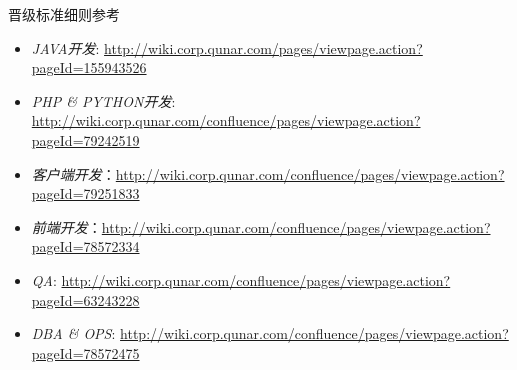\documentclass[handout]{beamer}
\begin{document}
\begin{CJK}{UTF8}{gbsn}
\begin{frame}{晋级标准细则参考}
  \begin{itemize}
  \item { \emph{JAVA开发}: \url{http://wiki.corp.qunar.com/pages/viewpage.action?pageId=155943526} }
  \item { \emph{PHP \& PYTHON开发}: \url{http://wiki.corp.qunar.com/confluence/pages/viewpage.action?pageId=79242519} }
  \item { \emph{客户端开发}：\url{http://wiki.corp.qunar.com/confluence/pages/viewpage.action?pageId=79251833} }
  \item { \emph{前端开发}：\url{http://wiki.corp.qunar.com/confluence/pages/viewpage.action?pageId=78572334} }
  \item { \emph{QA}: \url{http://wiki.corp.qunar.com/confluence/pages/viewpage.action?pageId=63243228} }
  \item { \emph{DBA \& OPS}: \url{http://wiki.corp.qunar.com/confluence/pages/viewpage.action?pageId=78572475} }
  \end{itemize}
\end{frame}



\end{CJK}
\end{document}
